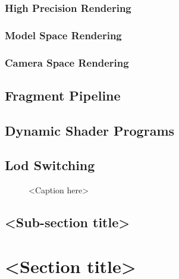 \subsubsection{High Precision Rendering}

\subsubsection{Model Space Rendering}

\subsubsection{Camera Space Rendering}

\subsection{Fragment Pipeline}

\subsection{Dynamic Shader Programs}

\subsection{Lod Switching}



\begin{figure}[htb]
\centering
\caption{<Caption here>}
\end{figure}

\subsection{<Sub-section title>}

\section{<Section title>}

